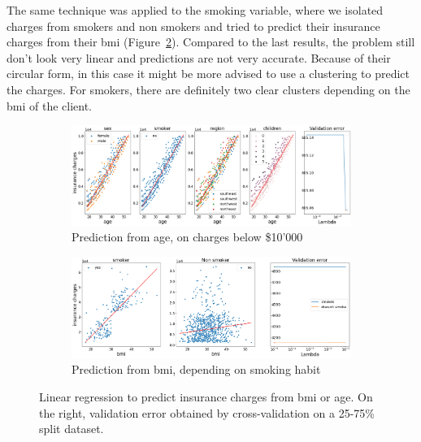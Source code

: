 \documentclass[10pt]{article}
\newenvironment{exercise}[2][Exercise]{\begin{trivlist}
  \item[\hskip \labelsep {\bfseries #1}\hskip \labelsep {\bfseries #2.}]}{\end{trivlist}}
\begin{document}
\begin{exercise}{8}
The same technique was applied to the smoking variable, where we isolated charges from smokers and non smokers and tried to predict their insurance charges from their bmi (Figure~\ref{fig:bmi-cluster-1}). Compared to the last results, the problem still don't look very linear and predictions are not very accurate. Because of their circular form, in this case it might be more advised to use a clustering to predict the charges. For smokers, there are definitely two clear clusters depending on the bmi of the client. 




\begin{figure}[!ht]
     \centering
     \begin{subfigure}[b]{1\textwidth}
         \centering
         \includegraphics[width=\textwidth]{doc/images/age_cluster.png}
         \caption{Prediction from age, on charges below \$10'000}
         \label{fig:age-cluster-1}
     \end{subfigure}
         \hfill
     \begin{subfigure}[b]{1\textwidth}
         \centering
         \includegraphics[width=\textwidth]{doc/images/smokes_clusters.png}
         \caption{Prediction from bmi, depending on smoking habit}
         \label{fig:bmi-cluster-1}
     \end{subfigure}
        \caption{Linear regression to predict insurance charges from bmi or age. On the right, validation error obtained by cross-validation on a 25-75\% split dataset.}
        \label{fig:age-bmi-clusters}
\end{figure}


\end{exercise}
\end{document}
